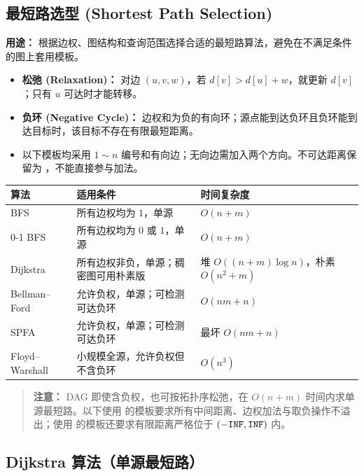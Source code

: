 

\subsection{最短路选型 (Shortest Path Selection)}

\textbf{用途：} 根据边权、图结构和查询范围选择合适的最短路算法，避免在不满足条件的图上套用模板。

\begin{itemize}
  \item \textbf{松弛 (Relaxation)：} 对边 $(u,v,w)$，若 $d[v]>d[u]+w$，就更新 $d[v]$；只有 $u$ 可达时才能转移。
  \item \textbf{负环 (Negative Cycle)：} 边权和为负的有向环；源点能到达负环且负环能到达目标时，该目标不存在有限最短距离。
  \item 以下模板均采用 $1\sim n$ 编号和有向边；无向边需加入两个方向。不可达距离保留为 ，不能直接参与加法。
\end{itemize}

\noindent\begin{tabularx}{\textwidth}{|l|X|l|}
  \hline
  \textbf{算法} & \textbf{适用条件} & \textbf{时间复杂度} \\
  \hline
  BFS & 所有边权均为 $1$，单源 & $O(n+m)$ \\
  \hline
  0-1 BFS & 所有边权均为 $0$ 或 $1$，单源 & $O(n+m)$ \\
  \hline
  Dijkstra & 所有边权非负，单源；稠密图可用朴素版 & 堆 $O((n+m)\log n)$，朴素 $O(n^2+m)$ \\
  \hline
  Bellman--Ford & 允许负权，单源；可检测可达负环 & $O(nm+n)$ \\
  \hline
  SPFA & 允许负权，单源；可检测可达负环 & 最坏 $O(nm+n)$ \\
  \hline
  Floyd--Warshall & 小规模全源，允许负权但不含负环 & $O(n^3)$ \\
  \hline
\end{tabularx}

\begin{quote}
\textbf{注意：} DAG 即使含负权，也可按拓扑序松弛，在 $O(n+m)$ 时间内求单源最短路。以下使用  的模板要求所有中间距离、边权加法与取负操作不溢出；使用  的模板还要求有限距离严格位于 $(-\texttt{INF},\texttt{INF})$ 内。
\end{quote}

\subsection{Dijkstra 算法（单源最短路）}

